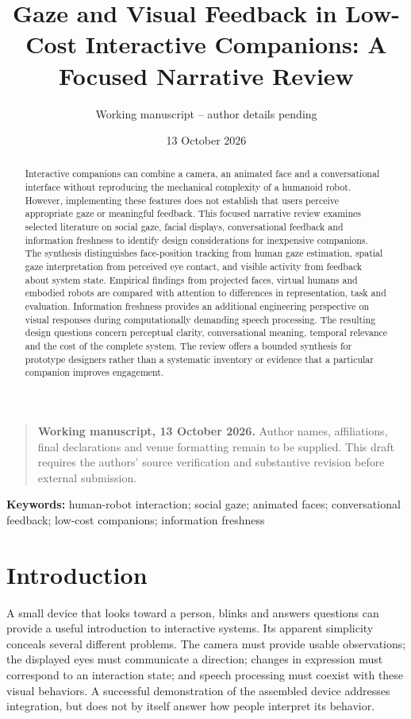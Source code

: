 \documentclass[11pt,a4paper]{article}
\title{Gaze and Visual Feedback in Low-Cost Interactive Companions: A Focused Narrative Review}
\author{Working manuscript -- author details pending}
\date{13 October 2026}
\begin{document}
\maketitle
\begin{quote}\small \textbf{Working manuscript, 13 October 2026.} Author names, affiliations, final declarations and venue formatting remain to be supplied. This draft requires the authors' source verification and substantive revision before external submission.\end{quote}
\begin{abstract}

Interactive companions can combine a camera, an animated face and a conversational interface without reproducing the mechanical complexity of a humanoid robot. However, implementing these features does not establish that users perceive appropriate gaze or meaningful feedback. This focused narrative review examines selected literature on social gaze, facial displays, conversational feedback and information freshness to identify design considerations for inexpensive companions. The synthesis distinguishes face-position tracking from human gaze estimation, spatial gaze interpretation from perceived eye contact, and visible activity from feedback about system state. Empirical findings from projected faces, virtual humans and embodied robots are compared with attention to differences in representation, task and evaluation. Information freshness provides an additional engineering perspective on visual responses during computationally demanding speech processing. The resulting design questions concern perceptual clarity, conversational meaning, temporal relevance and the cost of the complete system. The review offers a bounded synthesis for prototype designers rather than a systematic inventory or evidence that a particular companion improves engagement.

\end{abstract}
\textbf{Keywords:} human-robot interaction; social gaze; animated faces; conversational feedback; low-cost companions; information freshness

\section{Introduction}

A small device that looks toward a person, blinks and answers questions can provide a useful introduction to interactive systems. Its apparent simplicity conceals several different problems. The camera must provide usable observations; the displayed eyes must communicate a direction; changes in expression must correspond to an interaction state; and speech processing must coexist with these visual behaviors. A successful demonstration of the assembled device addresses integration, but does not by itself answer how people interpret its behavior.
\end{document}
